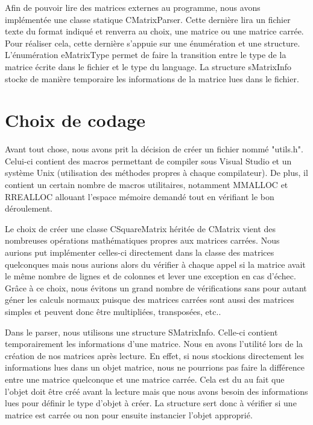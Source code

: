 		Afin de pouvoir lire des matrices externes au programme, nous avons implémentée une classe statique CMatrixParser. Cette dernière lira un fichier texte du format indiqué et renverra au choix, une matrice ou une matrice carrée. Pour réaliser cela, cette dernière s'appuie sur une énumération et une structure. L'énumération eMatrixType permet de faire la transition entre le type de la matrice écrite dans le fichier et le type du language. La structure sMatrixInfo stocke de manière temporaire les informations de la matrice lues dans le fichier. 
		
		
	\chapter{Choix de codage}
		Avant tout chose, nous avons prit la décision de créer un fichier nommé "utils.h". Celui-ci contient des macros permettant de compiler sous Visual Studio et un système Unix (utilisation des méthodes propres à chaque compilateur). De plus, il contient un certain nombre de macros utilitaires, notamment MMALLOC et RREALLOC allouant l'espace mémoire demandé tout en vérifiant le bon déroulement.
	
		Le choix de créer une classe CSquareMatrix héritée de CMatrix vient des nombreuses opérations mathématiques propres aux matrices carrées. Nous aurions put implémenter celles-ci directement dans la classe des matrices quelconques mais nous aurions alors du vérifier à chaque appel si la matrice avait le même nombre de lignes et de colonnes et lever une exception en cas d'échec.
		Grâce à ce choix, nous évitons un grand nombre de vérifications sans pour autant géner les calculs normaux puisque des matrices carrées sont aussi des matrices simples et peuvent donc être multipliées, transposées, etc..
		
		
	
		Dans le parser, nous utilisons une structure SMatrixInfo. Celle-ci contient temporairement les informations d'une matrice. Nous en avons l'utilité lors de la création de nos matrices après lecture. En effet, si nous stockions directement les informations lues dans un objet matrice, nous ne pourrions pas faire la différence entre une matrice quelconque et une matrice carrée. Cela est du au fait que l'objet doit être créé avant la lecture mais que nous avons besoin des informations lues pour définir le type d'objet à créer. La structure sert donc à vérifier si une matrice est carrée ou non pour ensuite instancier l'objet approprié.
	
